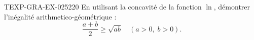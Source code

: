 \begin{exercice}{TEXP-GRA-EX-025}{2}{20}
En utilisant la concavité de la fonction $\ln$, démontrer l'inégalité arithmetico-géométrique :
\[ \frac{a+b}{2} \geq \sqrt{ab} \quad (a > 0,\; b > 0). \]

\end{exercice}
